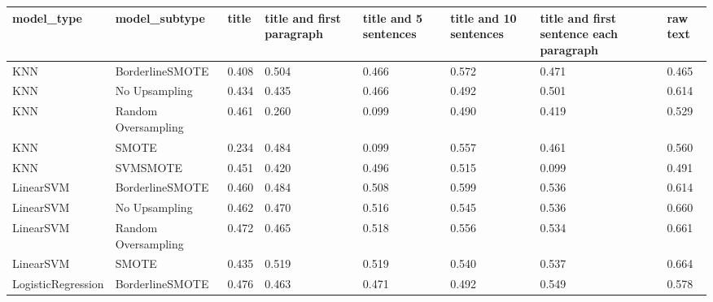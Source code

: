 \begin{tabular}{llllllll}
\toprule
                  model\_type &       model\_subtype & title & title and first paragraph & title and 5 sentences & title and 10 sentences & title and first sentence each paragraph &  raw text \\
\midrule
                         KNN &     BorderlineSMOTE & 0.408 &                     0.504 &                 0.466 &                  0.572 &                                   0.471 &     0.465 \\
                         KNN &       No Upsampling & 0.434 &                     0.435 &                 0.466 &                  0.492 &                                   0.501 &     0.614 \\
                         KNN & Random Oversampling & 0.461 &                     0.260 &                 0.099 &                  0.490 &                                   0.419 &     0.529 \\
                         KNN &               SMOTE & 0.234 &                     0.484 &                 0.099 &                  0.557 &                                   0.461 &     0.560 \\
                         KNN &            SVMSMOTE & 0.451 &                     0.420 &                 0.496 &                  0.515 &                                   0.099 &     0.491 \\
                   LinearSVM &     BorderlineSMOTE & 0.460 &                     0.484 &                 0.508 &                  0.599 &                                   0.536 &     0.614 \\
                   LinearSVM &       No Upsampling & 0.462 &                     0.470 &                 0.516 &                  0.545 &                                   0.536 &     0.660 \\
                   LinearSVM & Random Oversampling & 0.472 &                     0.465 &                 0.518 &                  0.556 &                                   0.534 &     0.661 \\
                   LinearSVM &               SMOTE & 0.435 &                     0.519 &                 0.519 &                  0.540 &                                   0.537 &     0.664 \\
          LogisticRegression &     BorderlineSMOTE & 0.476 &                     0.463 &                 0.471 &                  0.492 &                                   0.549 &     0.578 \\

\end{tabular}
